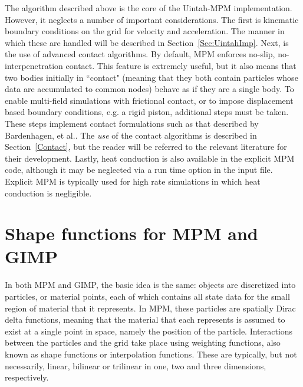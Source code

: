 The algorithm described above is the core of the Uintah-MPM implementation.
However, it neglects a number of important considerations.  The first is
kinematic boundary conditions on the grid for velocity and acceleration.
The manner in which these are handled will be described in
Section~\ref{Sec:UintahImp}.  Next, is the use of advanced contact
algorithms.  By default, MPM enforces no-slip, no-interpenetration contact.
This feature is extremely useful, but it also means that two bodies initially
in ``contact" (meaning that they both contain particles whose data are
accumulated to common nodes) behave as if they are a single body.  To enable
multi-field simulations with frictional contact, or to impose displacement
based boundary conditions, e.g. a rigid piston, additional steps must be
taken.  These steps implement contact formulations such as that described
by Bardenhagen, et al.\cite{bard_contact}.  The {\it use} of the contact
algorithms is described in Section~\ref{Contact}, but the reader will be
referred to the relevant literature for their development.  Lastly, heat
conduction is also available in the explicit MPM code, although it may be
neglected via a run time option in the input file.  Explicit MPM is typically
used for high rate simulations in which heat conduction is negligible.

\section{Shape functions for MPM and GIMP} \label{gimp_mpm}

In both MPM and GIMP, the basic idea is the same: objects are discretized into
particles, or material points, each of which contains all state data for the
small region of material that it represents.  In MPM, these particles are spatially
Dirac delta functions, meaning that the material that each represents is
assumed to exist at a single point in space, namely the position of the
particle.  Interactions between the particles and the grid take place
using weighting functions, also known as shape functions or interpolation
functions.  These are typically, but not necessarily, linear, bilinear or
trilinear in one, two and three dimensions, respectively.

